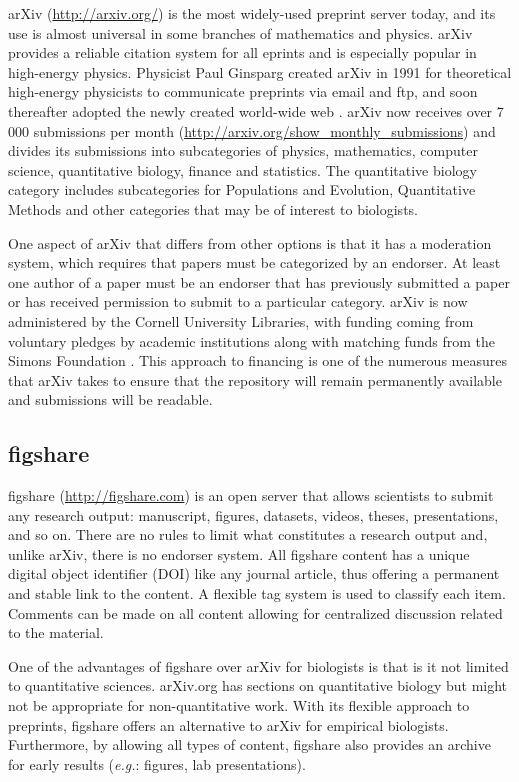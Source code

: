 \documentclass[letterpaper,twocolumn,superscriptaddress,showkeys,longbibliography]{revtex4-1}
\begin{document}
arXiv (\url{http://arxiv.org/}) is the most widely-used preprint server today,
and its use is almost universal in some branches of mathematics and physics.
arXiv provides a reliable citation system for all eprints and is especially
popular in high-energy physics. Physicist Paul Ginsparg created arXiv in 1991
for theoretical high-energy physicists to communicate preprints via email and
ftp, and soon thereafter adopted the newly created world-wide web
\cite{jackson2002preprints}.  arXiv now receives over 7 000 submissions per
month (\url{http://arxiv.org/show_monthly_submissions}) and divides its
submissions into subcategories of physics, mathematics, computer science,
quantitative biology, finance and statistics.  The quantitative biology category
includes subcategories for Populations and Evolution, Quantitative Methods and
other categories that may be of interest to biologists.

One aspect of arXiv that differs from other options is that it has a moderation
system, which requires that papers must be categorized by an endorser.  At least
one author of a paper must be an endorser that has previously submitted a paper
or has received permission to submit to a particular category. arXiv is now
administered by the Cornell University Libraries, with funding coming from
voluntary pledges by academic institutions along with matching funds from the
Simons Foundation \cite{arxiv_future}. This approach to financing is one of the
numerous measures that arXiv takes to ensure that the repository will remain
permanently available and submissions will be readable.

\subsection{figshare}

figshare (\href{http://figshare.com}{http://figshare.com}) is an open server
that allows scientists to submit any research output: manuscript, figures,
datasets, videos, theses, presentations, and so on. There are no rules to limit
what constitutes a research output and, unlike arXiv, there is no endorser
system. All figshare content has a unique digital object identifier (DOI) like
any journal article, thus offering a permanent and stable link to the content.
A flexible tag system is used to classify each item. Comments can be made on all
content allowing for centralized discussion related to the material.

One of the advantages of figshare over arXiv for biologists is that is it not
limited to quantitative sciences. arXiv.org has sections on quantitative biology
but might not be appropriate for non-quantitative work. With its flexible
approach to preprints, figshare offers an alternative to arXiv for empirical
biologists. Furthermore, by allowing all types of content, figshare also
provides an archive for early results (\emph{e.g.}: figures, lab presentations).
\end{document}
